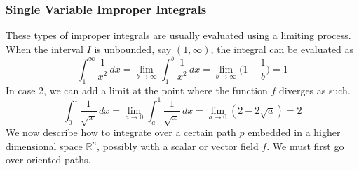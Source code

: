 \documentclass{article}
\theoremstyle{remark}
\theoremstyle{definition}
\begin{document}
\subsubsection{Single Variable Improper Integrals}
These types of improper integrals are usually evaluated using a limiting process. When the interval $I$ is unbounded, say $(1, \infty)$, the integral can be evaluated as 
\[\int_1^\infty \frac{1}{x^2} \,dx = \lim_{b \rightarrow \infty} \int_1^b \frac{1}{x^2} \, dx = \lim_{b\rightarrow \infty} \bigg( 1 - \frac{1}{b} \bigg) = 1\]
In case 2, we can add a limit at the point where the function $f$ diverges as such. 
\[\int_0^1 \frac{1}{\sqrt{x}} \, dx = \lim_{a \rightarrow 0} \int_a^1 \frac{1}{\sqrt{x}} \, dx = \lim_{a \rightarrow 0} (2 - 2\sqrt{a}) = 2\]
We now describe how to integrate over a certain path $p$ embedded in a higher dimensional space $\mathbb{R}^n$, possibly with a scalar or vector field $f$. We must first go over oriented paths. 
\end{document}

